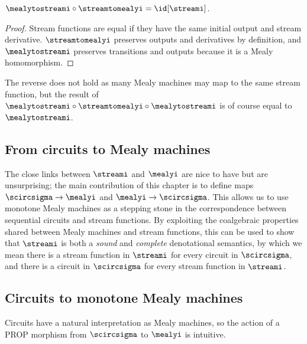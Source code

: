\documentclass{lmcs}
\begin{document}
\begin{prop}\label{prop:mealy-stream-id}
    \(\mealytostreami \circ \streamtomealyi = \id[\streami]\).
\end{prop}
\begin{proof}
    Stream functions are equal if they have the same initial output and
    stream derivative.
    \(\streamtomealyi\) preserves outputs and derivatives by definition, and
    \(\mealytostreami\) preserves transitions and outputs because it is a Mealy
    homomorphism.
\end{proof}

The reverse does not hold as many Mealy machines may map to the same stream
function, but the result of
\(\mealytostreami \circ \streamtomealyi \circ \mealytostreami\) is of course
equal to \(\mealytostreami\).

\subsection{From circuits to Mealy machines}\label{sec:synthesis}

The close links between \(\streami\) and \(\mealyi\) are nice to have but are
unsurprising; the main contribution of this chapter is to define maps
\(\scircsigma \to \mealyi\) and \(\mealyi \to \scircsigma\).
This allows us to use monotone Mealy machines as a stepping stone in the
correspondence between sequential circuits and stream functions.
By exploiting the coalgebraic properties shared between Mealy machines and
stream functions, this can be used to show that \(\streami\) is both a
\emph{sound} and \emph{complete} denotational semantics, by which we mean there
is a stream function in \(\streami\) for every circuit in \(\scircsigma\), and
there is a circuit in \(\scircsigma\) for every stream function in \(\streami\).

\subsection{Circuits to monotone Mealy machines}

Circuits have a natural interpretation as Mealy machines, so the action
of a PROP morphism from \(\scircsigma\) to \(\mealyi\) is intuitive.
\end{document}
